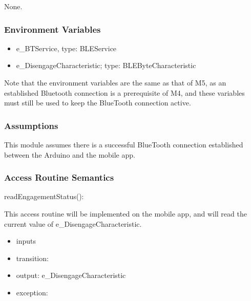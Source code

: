 \documentclass[12pt, titlepage]{article}
\begin{document}
None. 

\subsubsection{Environment Variables}


\begin{itemize}
\item e\_BTService, type: BLEService
\item e\_DisengageCharacteristic; type: BLEByteCharacteristic
\end{itemize}

Note that the environment variables are the same as that of M5, as an established Bluetooth connection is a prerequisite of M4, and these variables must still be used to keep the BlueTooth connection active. 

\subsubsection{Assumptions}


This module assumes there is a successful BlueTooth connection established between the Arduino and the mobile app. 

\subsubsection{Access Routine Semantics}


\noindent readEngagementStatus():

This access routine will be implemented on the mobile app, and will read the current value of  e\_DisengageCharacteristic.

\begin{itemize}
\item inputs
\item transition: %
\item output: e\_DisengageCharacteristic
\item exception:  
\end{itemize}
\end{document}
